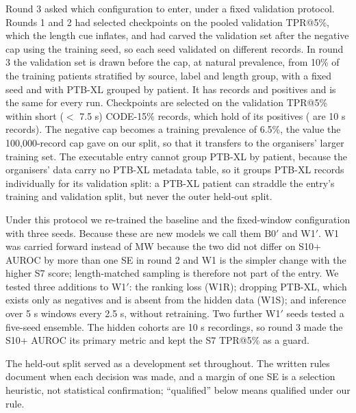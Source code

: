 \documentclass{iopjournal}
\makeatletter
\newcommand{\tpr}{TPR@5\%}
\newcommand{\Bp}{B0$'$}
\newcommand{\Wp}{W1$'$}
\makeatother
\begin{document}
Round 3 asked which configuration to enter, under a fixed validation protocol. Rounds 1 and 2 had selected checkpoints on the pooled validation \tpr, which the length cue inflates, and had carved the validation set after the negative cap using the training seed, so each seed validated on different records. In round 3 the validation set is drawn before the cap, at natural prevalence, from 10\% of the training patients stratified by source, label and length group, with a fixed seed and with PTB-XL grouped by patient. It has \rThreeValN{} records and \rThreeValPos{} positives and is the same for every run. Checkpoints are selected on the validation \tpr{} within short ($<$ 7.5 s) CODE-15\% records, which hold \rThreeValPosSseven{} of its positives (\rThreeValPosStenPlus{} are 10 s records). The negative cap becomes a training prevalence of 6.5\%, the value the 100,000-record cap gave on our split, so that it transfers to the organisers' larger training set. The executable entry cannot group PTB-XL by patient, because the organisers' data carry no PTB-XL metadata table, so it groups PTB-XL records individually for its validation split: a PTB-XL patient can straddle the entry's training and validation split, but never the outer held-out split.

Under this protocol we re-trained the baseline and the fixed-window configuration with three seeds. Because these are new models we call them \Bp{} and \Wp. W1 was carried forward instead of MW because the two did not differ on S10+ AUROC by more than one SE in round 2 and W1 is the simpler change with the higher S7 score; length-matched sampling is therefore not part of the entry. We tested three additions to \Wp: the ranking loss (W1R); dropping PTB-XL, which exists only as negatives and is absent from the hidden data (W1S); and inference over 5 s windows every 2.5 s, without retraining. Two further \Wp{} seeds tested a five-seed ensemble. The hidden cohorts are 10 s recordings, so round 3 made the S10+ AUROC its primary metric and kept the S7 \tpr{} as a guard.

The held-out split served as a development set throughout. The written rules document when each decision was made, and a margin of one SE is a selection heuristic, not statistical confirmation; ``qualified'' below means qualified under our rule.
\end{document}
